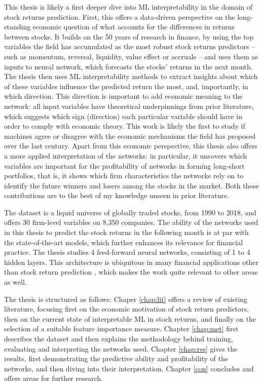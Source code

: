 This thesis is likely a first deeper dive into ML interpretability in the domain of stock returns prediction. First, this offers a data-driven perspective on the long-standing economic question of what accounts for the differences in returns between stocks. It builds on the 50 years of research in finance, by using the top variables the field has accumulated as the most robust stock returns predictors -- such as momentum, reversal, liquidity, value effect or accruals -- and uses them as inputs to neural network, which forecasts the stocks' returns in the next month. The thesis then uses ML interpretability methods to extract insights about which of these variables influence the predicted return the most, and, importantly, in which direction. This direction is important to add economic meaning to the network: all input variables have theoretical underpinnings from prior literature, which suggests which sign (direction) each particular variable should have in order to comply with economic theory. This work is likely the first to study if machines agree or disagree with the economic mechanisms the field has proposed over the last century. Apart from this economic perspective, this thesis also offers a more applied interpretation of the networks: in particular, it uncovers which variables are important for the profitability of networks in forming long-short portfolios, that is, it shows which firm characteristics the networks rely on to identify the future winners and losers among the stocks in the market. Both these contributions are to the best of my knowledge unseen in prior literature.  

The dataset is a liquid universe of globally traded stocks, from 1990 to 2018, and offers 30 firm-level variables on 8,350 companies. The ability of the networks used in this thesis to predict the stock returns in the following month is at par with the state-of-the-art models, which further enhances its relevance for financial practice. The thesis studies 4 feed-forward neural networks, consisting of 1 to 4 hidden layers. This architecture is ubiquitous in many financial applications other than stock return prediction \citep{fadlalla2001analysis}, which makes the work quite relevant to other areas as well.    

The thesis is structured as follows: Chaper \ref{chap:lit} offers a review of existing literature, focusing first on the economic motivation of stock return predictors, then on the current state of interpretable ML in stock returns, and finally on the selection of a suitable feature importance measure. Chapter \ref{chap:met} first describes the dataset and then explains the methodology behind training, evaluating and interpreting the networks used. Chapter \ref{chap:res} gives the results, first demonstrating the predictive ability and profitability of the networks, and then diving into their interpretation. Chapter \ref{con} concludes and offers areas for further research. 
